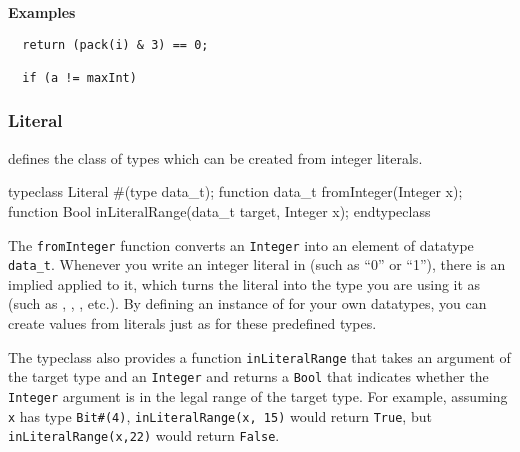 {\bf Examples}
\begin{verbatim}
  return (pack(i) & 3) == 0;
 
  if (a != maxInt)
\end{verbatim}


\subsubsection{Literal}
\label{literal}

 defines the class of types which can be created from
integer literals.

\begin{libverbatim}
   typeclass Literal #(type data_t);
       function data_t fromInteger(Integer x);
       function Bool   inLiteralRange(data_t target, Integer x);
   endtypeclass
\end{libverbatim}

The {\tt fromInteger} function converts an {\tt Integer} into an
element of  datatype {\tt data\_t}.  Whenever you write an integer
literal in \BSV (such as ``0'' or ``1''), there is an implied 
applied to it, which turns the literal into the type you are using it
as (such as , , , etc.).  By defining an
instance of  for your own datatypes, you can create values
from literals just as for these predefined types.

The typeclass also provides a function \texttt{inLiteralRange} that takes 
an argument of the target type and an \texttt{Integer} and returns a 
\texttt{Bool} that indicates whether the \texttt{Integer} argument is in 
the legal range of the target type. For example, assuming \texttt{x} has type 
\texttt{Bit\#(4)}, \texttt{inLiteralRange(x, 15)} would return \texttt{True}, 
but \texttt{inLiteralRange(x,22)} would return \texttt{False}.

